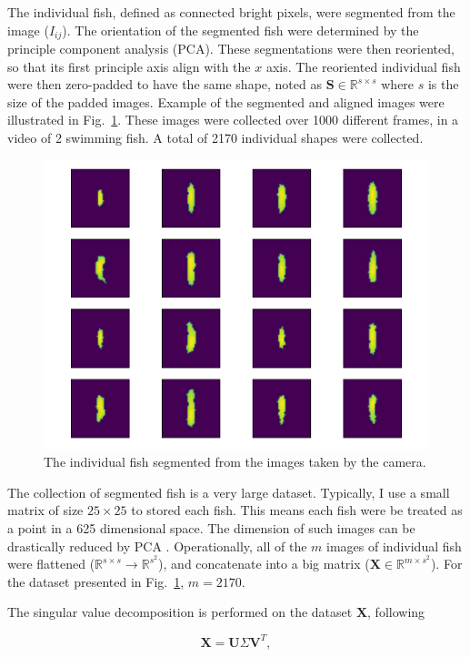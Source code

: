 \documentclass[11pt,twoside]{report}
\begin{document}
The individual fish, defined as connected bright pixels, were segmented from the image ($I_{ij}$).
The orientation of the segmented fish were determined by the principle component analysis (PCA). These segmentations were then reoriented, so that its first principle axis align with the $x$ axis. The reoriented individual fish were then zero-padded to have the same shape, noted as $\mathbf{S} \in \mathbb{R}^{s \times s}$ where $s$ is the size of the padded images. Example of the segmented and aligned images were illustrated in Fig.~\ref{fig:fish_segment}. These images were collected over 1000 different frames, in a video of 2 swimming fish. A total of 2170 individual shapes were collected.


\begin{figure}
  \includegraphics[width=0.75\linewidth]{segment_result_selection}
  \caption{The individual fish segmented from the images taken by the camera.}
  \label{fig:fish_segment}
\end{figure}


The collection of segmented fish is a very large dataset. Typically, I use a small matrix of size $25 \times 25$ to stored each fish. This means each fish were be treated as a point in a 625 dimensional space.
The dimension of such images can be drastically reduced by PCA \cite{solem2012book}. Operationally, all of the $m$ images of individual fish were flattened
($\mathbb{R}^{s \times s} \rightarrow \mathbb{R}^{s^2}$),
and concatenate into a big matrix ($\mathbf{X} \in \mathbb{R}^{m \times s^2}$). For the dataset presented in Fig.~\ref{fig:fish_segment}, $m=2170$.

The singular value decomposition is performed on the dataset $\mathbf{X}$, following

$$
\mathbf{X} = \mathbf{U} \Sigma \mathbf{V}^T,
$$
\end{document}
